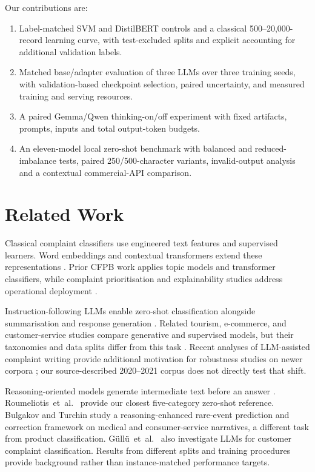 \documentclass[pdflatex,sn-mathphys-num]{sn-jnl}
\begin{document}
Our contributions are:
\begin{enumerate}
  \item Label-matched SVM and DistilBERT controls and a classical
        500--20,000-record learning curve, with test-excluded splits and
        explicit accounting for additional validation labels.
  \item Matched base/adapter evaluation of three LLMs over three training
        seeds, with validation-based checkpoint selection, paired
        uncertainty, and measured training and serving resources.
  \item A paired Gemma/Qwen thinking-on/off experiment with fixed
        artifacts, prompts, inputs and total output-token budgets.
  \item An eleven-model local zero-shot benchmark with balanced and
        reduced-imbalance tests, paired 250/500-character variants,
        invalid-output analysis and a contextual commercial-API comparison.
\end{enumerate}

\section{Related Work}
\label{sec:related}

Classical complaint classifiers use engineered text features and
supervised learners. Word embeddings and contextual transformers
extend these representations \cite{lilleberg2015word2vec,devlin2019bert}.
Prior CFPB work applies topic models and transformer classifiers,
while complaint prioritisation and explainability studies address
operational deployment \cite{raju2022bertopic,grootendorst2022bertopic,
vairetti2024bert,das2024explainable,liu2024framework}.

Instruction-following LLMs enable zero-shot classification alongside
summarisation and response generation \cite{brown2020gpt3,zhao2023survey,
correa2024genai}. Related tourism, e-commerce, and customer-service
studies compare generative and supervised models, but their taxonomies
and data splits differ from this task \cite{roumeliotis2024tourism,
roumeliotis2024ecommerce,li2024customerservice}. Recent analyses of
LLM-assisted complaint writing provide additional motivation for
robustness studies on newer corpora \cite{shin2025llmwritten,liang2025cfpb};
our source-described 2020--2021 corpus does not directly test that shift.

Reasoning-oriented models generate intermediate text before an answer
\cite{wei2022chainofthought,deepseekllm2024,guo2025deepseekr1,qwen2025qwen3}.
Roumeliotis~et~al.\ \cite{roumeliotis2025think} provide our closest
five-category zero-shot reference. Bulgakov and Turchin
\cite{bulgakov2026deepseek} study a reasoning-enhanced rare-event
prediction and correction framework on medical and consumer-service
narratives, a different task from product classification.
G{\"u}ll{\"u}~et~al.\ \cite{gullu2025llama} also investigate
LLMs for customer complaint classification. Results from different
splits and training procedures provide background rather than
instance-matched performance targets.
\end{document}

